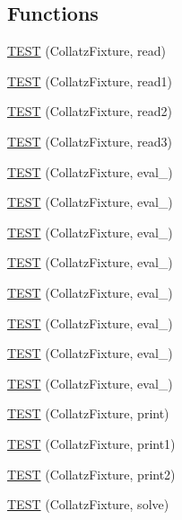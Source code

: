 \subsection*{Functions}
\begin{DoxyCompactItemize}
\item 
\hyperlink{im5283-TestCollatz_8c_09_09_a528303af22c7c5a550af7342092a9f05}{T\-E\-S\-T} (Collatz\-Fixture, read)
\item 
\hyperlink{im5283-TestCollatz_8c_09_09_a86061488c66d6ec3993858a2fbc36b0f}{T\-E\-S\-T} (Collatz\-Fixture, read1)
\item 
\hyperlink{im5283-TestCollatz_8c_09_09_ab878f3675d378e526be517f391de93fa}{T\-E\-S\-T} (Collatz\-Fixture, read2)
\item 
\hyperlink{im5283-TestCollatz_8c_09_09_ae01e053db02b2e24bc79f2e52531cc59}{T\-E\-S\-T} (Collatz\-Fixture, read3)
\item 
\hyperlink{im5283-TestCollatz_8c_09_09_aa0fcdadaf0d4f7fe0919c37746fe7c74}{T\-E\-S\-T} (Collatz\-Fixture, eval\-\_)
\item 
\hyperlink{im5283-TestCollatz_8c_09_09_a333bb6921f06fa177e9818dbcf3eda06}{T\-E\-S\-T} (Collatz\-Fixture, eval\-\_)
\item 
\hyperlink{im5283-TestCollatz_8c_09_09_a251001c75c1226c607534268ab3a5bcb}{T\-E\-S\-T} (Collatz\-Fixture, eval\-\_)
\item 
\hyperlink{im5283-TestCollatz_8c_09_09_a033aa388470c35adc9579303dba1afa2}{T\-E\-S\-T} (Collatz\-Fixture, eval\-\_)
\item 
\hyperlink{im5283-TestCollatz_8c_09_09_ab529bbfe532bd0b6fbc11c51fe0af7e5}{T\-E\-S\-T} (Collatz\-Fixture, eval\-\_)
\item 
\hyperlink{im5283-TestCollatz_8c_09_09_adebb7237f2a00c256cd0c733885ccd58}{T\-E\-S\-T} (Collatz\-Fixture, eval\-\_)
\item 
\hyperlink{im5283-TestCollatz_8c_09_09_a4428eb890eb2825bcd806812ccf3edc3}{T\-E\-S\-T} (Collatz\-Fixture, eval\-\_)
\item 
\hyperlink{im5283-TestCollatz_8c_09_09_a2e12d9c89f94e5227e499d7703f9dfaa}{T\-E\-S\-T} (Collatz\-Fixture, eval\-\_)
\item 
\hyperlink{im5283-TestCollatz_8c_09_09_a1be21485425cf43808a497ed8ef4d418}{T\-E\-S\-T} (Collatz\-Fixture, print)
\item 
\hyperlink{im5283-TestCollatz_8c_09_09_a7ff0f20b9076fc1762bec9d580e29238}{T\-E\-S\-T} (Collatz\-Fixture, print1)
\item 
\hyperlink{im5283-TestCollatz_8c_09_09_a99f7dd94c98bff5b2e206c364d57e917}{T\-E\-S\-T} (Collatz\-Fixture, print2)
\item 
\hyperlink{im5283-TestCollatz_8c_09_09_a07f06cda216730b4038ffd06db5a3d1f}{T\-E\-S\-T} (Collatz\-Fixture, solve)
\end{DoxyCompactItemize}


